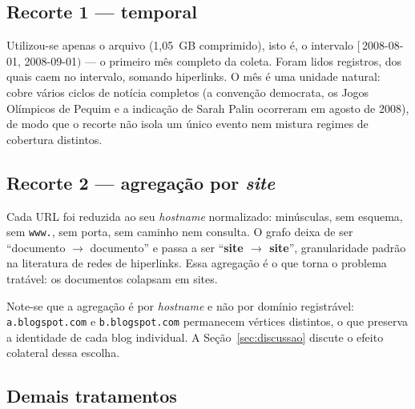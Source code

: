 \documentclass[sigconf]{webmedia}
\begin{document}
\noindent{}

\subsection{Recorte 1 --- temporal}

Utilizou-se apenas o arquivo \recorteArquivo{} (1,05~GB comprimido), isto
é, o intervalo $[\,$2008-08-01$,\,$2008-09-01$)$ --- o primeiro mês
completo da coleta. Foram lidos \docsLidos{} registros, dos quais
\docsRecorte{} caem no intervalo, somando \hiperlinksRecorte{} hiperlinks.
O mês é uma unidade natural: cobre vários ciclos de notícia completos
(a convenção democrata, os Jogos Olímpicos de Pequim e a indicação de
Sarah Palin ocorreram em agosto de 2008), de modo que o recorte não
isola um único evento nem mistura regimes de cobertura distintos.

\subsection{Recorte 2 --- agregação por \textit{site}}

Cada URL foi reduzida ao seu \emph{hostname} normalizado: minúsculas, sem
esquema, sem \texttt{www.}, sem porta, sem caminho nem consulta. O grafo
deixa de ser ``documento $\to$ documento'' e passa a ser
``\textbf{site $\to$ site}'', granularidade padrão na literatura de redes
de hiperlinks. Essa agregação é o que torna o problema tratável: os
\docsRecorte{} documentos colapsam em \numVertices{} sites.

Note-se que a agregação é por \emph{hostname} e não por domínio
registrável: \texttt{a.blogspot.com} e \texttt{b.blogspot.com} permanecem
vértices distintos, o que preserva a identidade de cada blog individual.
A Seção~\ref{sec:discussao} discute o efeito colateral dessa escolha.

\subsection{Demais tratamentos}
\end{document}
